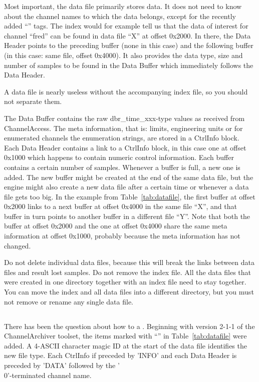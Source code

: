 Most important, the data file primarily stores data. It does not need
to know about the channel names to which the data belongs, except for
the recently added ``\dag'' tags. The index would for example tell us
that the data of interest for channel ``fred'' can be found in data
file ``X'' at offset 0x2000. In there, the Data Header points to the
preceding buffer (none in this case) and the following buffer (in this
case: same file, offset 0x4000). It also provides the data type, size
and number of samples to be found in the Data Buffer
which immediately follows the Data Header.

 A data file is nearly useless without the
accompanying index file, so you should not separate them.

\noindent The Data Buffer contains the raw dbr\_time\_xxx-type values
as received from ChannelAccess. The meta information, that is: limits,
engineering units or for enumerated channels the enumeration strings,
are stored in a CtrlInfo block. Each Data Header contains a link to a
CtrlInfo block, in this case one at offset 0x1000 which happens to
contain numeric control information.
Each buffer contains a certain number of samples. Whenever a buffer is
full, a new one is added. The new buffer might be created at the end
of the same data file, but the engine might also create a new data
file after a certain time or whenever a data file gets too big.
In the example from Table~\ref{tab:datafile}, the first buffer at offset
0x2000 links to a next buffer at offset 0x4000 in the same file ``X'',
and that buffer in turn points to another buffer in a different file
``Y''. Note that both the buffer at offset 0x2000 and the one at
offset 0x4000 share the same meta information at offset 0x1000,
probably because the meta information has not changed.

 Do not delete individual data
files, because this will break the links between data files and result
lost samples. Do not remove the index file. All the data files that were
created in one directory together with an index file need to stay together.
You can move the index and all data files into a different directory, but
you must not remove or rename any single data file.

\subsection{}
There has been the question about how to  a
.
Beginning with version 2-1-1 of the ChannelArchiver toolset, the items
marked with ``\dag'' in Table~\ref{tab:datafile} were added.  A
4-ASCII character magic ID at the start of the data file identifies
the new file type. Each CtrlInfo if preceded by 'INFO' and each Data
Header is preceded by 'DATA' followed by the '\\0'-terminated channel
name.

